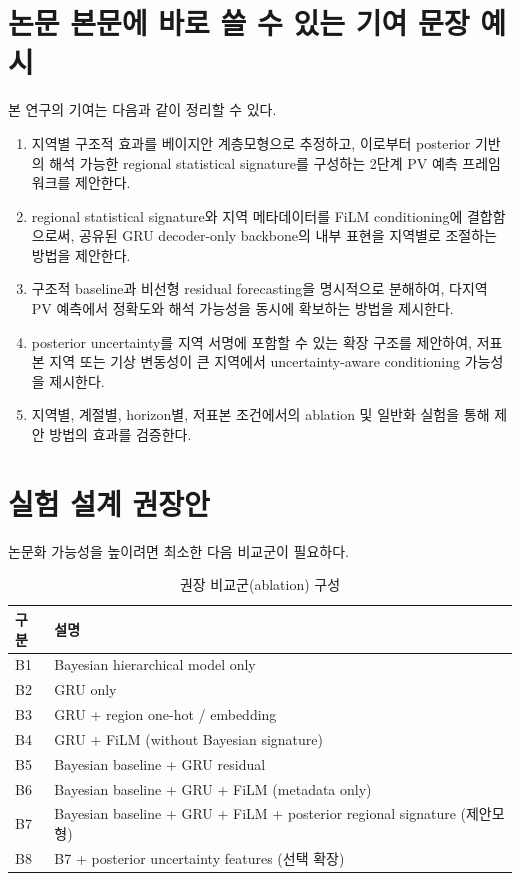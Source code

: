 \documentclass[11pt,a4paper]{article}
\begin{document}
\section{논문 본문에 바로 쓸 수 있는 기여 문장 예시}
본 연구의 기여는 다음과 같이 정리할 수 있다.
\begin{enumerate}[label=\textbf{C\arabic*.}, leftmargin=2.2em]
    \item 지역별 구조적 효과를 베이지안 계층모형으로 추정하고, 이로부터 posterior 기반의 해석 가능한 regional statistical signature를 구성하는 2단계 PV 예측 프레임워크를 제안한다.
    \item regional statistical signature와 지역 메타데이터를 FiLM conditioning에 결합함으로써, 공유된 GRU decoder-only backbone의 내부 표현을 지역별로 조절하는 방법을 제안한다.
    \item 구조적 baseline과 비선형 residual forecasting을 명시적으로 분해하여, 다지역 PV 예측에서 정확도와 해석 가능성을 동시에 확보하는 방법을 제시한다.
    \item posterior uncertainty를 지역 서명에 포함할 수 있는 확장 구조를 제안하여, 저표본 지역 또는 기상 변동성이 큰 지역에서 uncertainty-aware conditioning 가능성을 제시한다.
    \item 지역별, 계절별, horizon별, 저표본 조건에서의 ablation 및 일반화 실험을 통해 제안 방법의 효과를 검증한다.
\end{enumerate}

\section{실험 설계 권장안}
논문화 가능성을 높이려면 최소한 다음 비교군이 필요하다.
\begin{table}[H]
\centering
\caption{권장 비교군(ablation) 구성}
\begin{tabular}{ll}
\toprule
구분 & 설명 \\
\midrule
B1 & Bayesian hierarchical model only \\
B2 & GRU only \\
B3 & GRU + region one-hot / embedding \\
B4 & GRU + FiLM (without Bayesian signature) \\
B5 & Bayesian baseline + GRU residual \\
B6 & Bayesian baseline + GRU + FiLM (metadata only) \\
B7 & Bayesian baseline + GRU + FiLM + posterior regional signature (제안모형) \\
B8 & B7 + posterior uncertainty features (선택 확장) \\
\bottomrule
\end{tabular}
\end{table}
\end{document}

